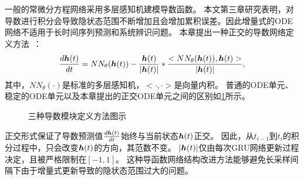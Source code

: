 一般的常微分方程网络采用多层感知机建模导数函数。
本文第三章研究表明，对导数进行积分会导致隐状态范围不断增加且会增加累积误差。因此增量式的ODE网络不适用于长时间序列预测和系统辨识问题。
本章提出一种正交的导数网络定义方法~\cite{jia2019neural}：
\begin{equation}
\frac{d \boldsymbol h(t)}{dt}=NN_{\theta}(\boldsymbol h(t))-\frac{\boldsymbol h(t)}{|\boldsymbol h(t)|}*\frac{<{NN_{\theta}(\boldsymbol h(t))},{\boldsymbol h(t)}>}{|\boldsymbol h(t)|},
\end{equation}
其中，$NN_{\theta}(\cdot)$是标准的多层感知机，$<\cdot, \cdot>$是向量内积。 
普通的ODE单元、稳定的ODE单元以及本章提出的正交ODE单元之间的区别如\ref{fig:cells}所示。
\begin{figure}[h]
    \centering
    \caption{三种导数模块定义方法图示}
    \label{fig:cells}
\end{figure}
正交形式保证了导数预测值$\frac{d \boldsymbol h(t)}{dt}$始终与当前状态$\boldsymbol h(t)$正交。
因此，从$t_{i-1}$到$t_{i}$的积分过程中，只会改变$\boldsymbol h(t)$的方向，其范数不变。
$|\boldsymbol h(t)|$仅由每次GRU网络更新过程决定，且被严格限制在$[-1,1]$。
这种导函数网络结构改进方法能够避免长采样间隔下由于增量式更新导致的隐状态范围过大的问题。

